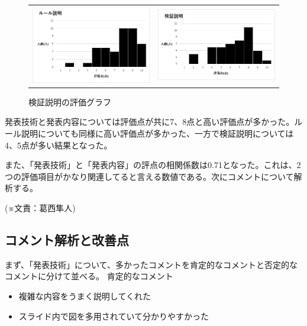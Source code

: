 \begin{figure}[h]
 \begin{tabular}{cc}
  \begin{minipage}[h]{0.45\hsize}
  \centering
 \includegraphics[width=0.7\linewidth]{./figure/ru-ru.jpg}
\caption{ルール説明の評価グラフ}
\label{ru-ru}
 \end{minipage} &

\begin{minipage}[h]{0.45\hsize}
  \centering
 \includegraphics[width=0.7\linewidth]{./figure/kensyou.jpg}
 \caption{検証説明の評価グラフ}
\label{kensyou}
\end{minipage} 
\end{tabular}
\end{figure}
発表技術と発表内容については評価点が共に7、8点と高い評価点が多かった。ルール説明についても同様に高い評価点が多かった、一方で検証説明については4、5点が多い結果となった。

また、「発表技術」と「発表内容」の評点の相関係数は0.71となった。これは、2つの評価項目がかなり関連してると言える数値である。次にコメントについて解析する。
\begin{flushright}
(※文責：葛西隼人)
\end{flushright}

\subsection{コメント解析と改善点}
まず、「発表技術」について、多かったコメントを肯定的なコメントと否定的なコメントに分けて並べる。
肯定的なコメント
\begin{itemize}
\item 複雑な内容をうまく説明してくれた
\item スライド内で図を多用されていて分かりやすかった
\end{itemize}

